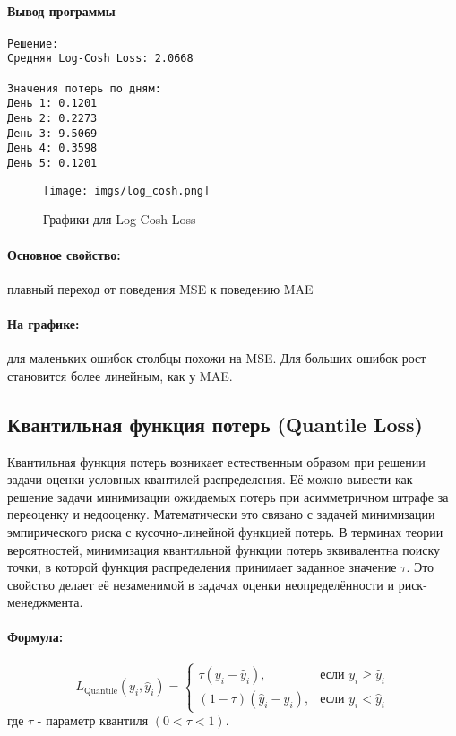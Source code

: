 \paragraph{Вывод программы}
\begin{verbatim}
Решение:
Средняя Log-Cosh Loss: 2.0668

Значения потерь по дням:
День 1: 0.1201
День 2: 0.2273
День 3: 9.5069
День 4: 0.3598
День 5: 0.1201
\end{verbatim}
\begin{figure}[h!]
    \centering
    \texttt{[image: imgs/log\_cosh.png]}
    \caption{Графики для Log-Cosh Loss}
\end{figure}

\paragraph{Основное свойство:} плавный переход от поведения MSE к поведению MAE

\paragraph{На графике:} для маленьких ошибок столбцы похожи на MSE. Для больших ошибок рост становится более линейным, как у MAE.

\subsection{Квантильная функция потерь (Quantile Loss)}

Квантильная функция потерь возникает естественным образом при решении задачи оценки условных квантилей распределения. Её можно вывести как решение задачи минимизации ожидаемых потерь при асимметричном штрафе за переоценку и недооценку. Математически это связано с задачей минимизации эмпирического риска с кусочно-линейной функцией потерь. В терминах теории вероятностей, минимизация квантильной функции потерь эквивалентна поиску точки, в которой функция распределения принимает заданное значение $\tau$. Это свойство делает её незаменимой в задачах оценки неопределённости и риск-менеджмента.

\paragraph{Формула:}

\[
L_{\text{Quantile}}(y_i, \hat{y}_i) = 
\begin{cases} 
\tau (y_i - \hat{y}_i), & \text{если } y_i \geq \hat{y}_i \\
(1 - \tau) (\hat{y}_i - y_i), & \text{если } y_i < \hat{y}_i
\end{cases}
\]
где $\tau$ - параметр квантиля $(0 < \tau < 1)$.


